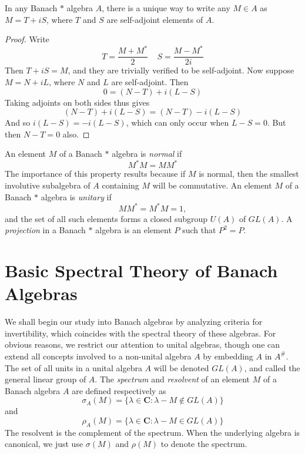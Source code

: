 \begin{prop}
    In any Banach $*$ algebra $A$, there is a unique way to write any $M \in A$ as $M = T + iS$, where $T$ and $S$ are self-adjoint elements of $A$.
\end{prop}
\begin{proof}
    Write
    \[ T = \frac{M + M^*}{2}\ \ \ \ \ S = \frac{M - M^*}{2i} \]
    Then $T + iS = M$, and they are trivially verified to be self-adjoint. Now suppose $M = N + iL$, where $N$ and $L$ are self-adjoint. Then
    \[ 0 = (N - T) + i(L - S) \]
    Taking adjoints on both sides thus gives
    \[ (N - T) + i(L - S) = (N - T) - i(L - S) \]
    And so $i(L - S) = -i(L - S)$, which can only occur when $L - S = 0$. But then $N - T = 0$ also.
\end{proof}

An element $M$ of a Banach $*$ algebra is \emph{normal} if
%
\[ M^* M = MM^* \]
%
The importance of this property results because if $M$ is normal, then the smallest involutive subalgebra of $A$ containing $M$ will be commutative. An element $M$ of a Banach $*$ algebra is \emph{unitary} if
%
\[ MM^* = M^*M = 1, \]
%
and the set of all such elements forms a closed subgroup $U(A)$ of $GL(A)$. A \emph{projection} in a Banach $*$ algebra is an element $P$ such that $P^2 = P$.






\chapter{Basic Spectral Theory of Banach Algebras}

We shall begin our study into Banach algebras by analyzing criteria for invertibility, which coincides with the spectral theory of these algebras. For obvious reasons, we restrict our attention to unital algebras, though one can extend all concepts involved to a non-unital algebra $A$ by embedding $A$ in $A^\#$. The set of all units in a unital algebra $A$ will be denoted $GL(A)$, and called the general linear group of $A$. The \emph{spectrum} and \emph{resolvent} of an element $M$ of a Banach algebra $A$ are defined respectively as
%
\[ \sigma_{A}(M) = \{ \lambda \in \mathbf{C} : \lambda - M \not \in GL(A) \} \]
%
and
%
\[ \rho_{A}(M) = \{ \lambda \in \mathbf{C} : \lambda - M \in GL(A) \} \]
%
The resolvent is the complement of the spectrum. When the underlying algebra is canonical, we just use $\sigma(M)$ and $\rho(M)$ to denote the spectrum. %

